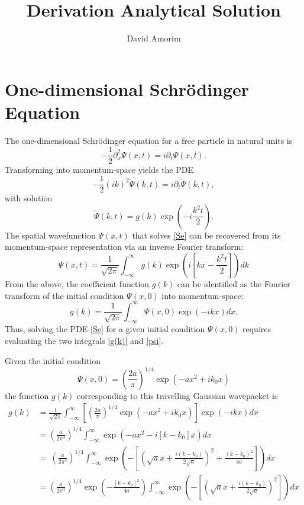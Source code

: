 \documentclass[11pt]{article}
\author{David Amorim}
\title{Derivation Analytical Solution}
\begin{document}
\maketitle

\section{One-dimensional Schr{\"o}dinger Equation}
The one-dimensional Schr{\"o}dinger equation for a free particle in natural units is 
\begin{equation}\label{Se}
- \frac{1}{2} \partial_x^2 \Psi(x,t) = i \partial_t \Psi(x,t).
\end{equation}
Transforming into momentum-space yields the PDE
$$ - \frac{1}{2} (i k )^2 \tilde{\Psi}(k,t) = i \partial_t \tilde{\Psi}(k,t),$$
with solution
$$ \tilde{\Psi}(k,t) = g(k) \exp \left({-i \frac{k^2 t}{2}} \right).$$
The spatial wavefunction $\Psi (x,t)$ that solves \eqref{Se} can be recovered from its momentum-space representation via an inverse Fourier transform:
\begin{equation}\label{psi}
 \Psi(x,t) = \frac{1}{\sqrt{2 \pi}} \int_{-\infty}^\infty g(k) \exp\left( i\left[kx - \frac{k^2t}{2} \right] \right) dk
\end{equation}
From the above, the coefficient function $g(k)$ can be identified as the Fourier transform of the initial condition $\Psi (x,0)$ into momentum-space:
\begin{equation}\label{g(k)}
g(k) = \frac{1}{\sqrt{2 \pi}} \int_{-\infty}^\infty \Psi (x,0) \exp({-ikx}) dx.
\end{equation}
Thus, solving the PDE \eqref{Se} for a given initial condition $\Psi (x,0)$ requires evaluating the two integrals \eqref{g(k)} and \eqref{psi}.  \par 
Given the initial condition 
\begin{equation}\label{in_cond}
 \Psi (x,0) = \left( \frac{2a}{\pi} \right)^{1/4} \exp({-ax^2+ik_0 x})
\end{equation}
the function $g(k)$ corresponding to this travelling Gaussian wavepacket is 
\begin{align*}
g(k) &=  \frac{1}{\sqrt{2 \pi}} \int_{-\infty}^\infty \left[ \left( \frac{2a}{\pi} \right)^{1/4} \exp({-ax^2+ik_0 x}) \right] \exp({-ikx}) dx \\
&=   \left( \frac{a}{2\pi^3} \right)^{1/4} \int_{-\infty}^\infty \exp(-ax^2-i[k-k_0] x)dx \\
&= \ \left( \frac{a}{2\pi^3} \right)^{1/4} \int_{-\infty}^\infty \exp\left( - \left[ \left( \sqrt{a}x + \frac{i (k-k_0)}{2 \sqrt{a}} \right)^2 + \frac{(k-k_0)^2}{4a} \right]  \right) dx \\
&= \left( \frac{a}{2\pi^3} \right)^{1/4}   \exp\left(-\frac{[k-k_0]^2}{4a} \right)  \int_{-\infty}^\infty  \exp\left( - \left[ \left( \sqrt{a}x + \frac{i (k-k_0)}{2 \sqrt{a}} \right)^2 \right]  \right) dx
\end{align*}
\end{document}

